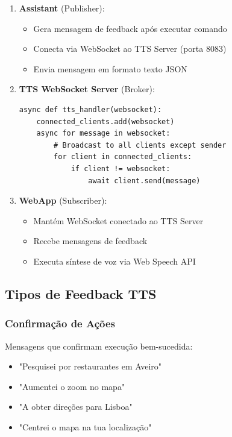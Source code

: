\begin{enumerate}
    \item \textbf{Assistant} (Publisher):
    \begin{itemize}
        \item Gera mensagem de feedback após executar comando
        \item Conecta via WebSocket ao TTS Server (porta 8083)
        \item Envia mensagem em formato texto JSON
    \end{itemize}

    \item \textbf{TTS WebSocket Server} (Broker):
    \begin{verbatim}
async def tts_handler(websocket):
    connected_clients.add(websocket)
    async for message in websocket:
        # Broadcast to all clients except sender
        for client in connected_clients:
            if client != websocket:
                await client.send(message)
    \end{verbatim}

    \item \textbf{WebApp} (Subscriber):
    \begin{itemize}
        \item Mantém WebSocket conectado ao TTS Server
        \item Recebe mensagens de feedback
        \item Executa síntese de voz via Web Speech API
    \end{itemize}
\end{enumerate}

\subsection{Tipos de Feedback TTS}

\subsubsection{Confirmação de Ações}

Mensagens que confirmam execução bem-sucedida:
\begin{itemize}
    \item "Pesquisei por restaurantes em Aveiro"
    \item "Aumentei o zoom no mapa"
    \item "A obter direções para Lisboa"
    \item "Centrei o mapa na tua localização"
\end{itemize}

